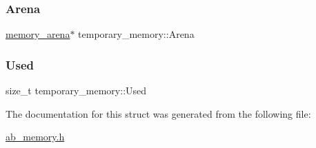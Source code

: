 \subsubsection{\texorpdfstring{Arena}{Arena}}
{\footnotesize\ttfamily \hyperlink{structmemory__arena}{memory\+\_\+arena}$\ast$ temporary\+\_\+memory\+::\+Arena}

\mbox{\label{structtemporary__memory_af2ea8e067d881e044fbecd269e59a556}} 
\subsubsection{\texorpdfstring{Used}{Used}}
{\footnotesize\ttfamily size\+\_\+t temporary\+\_\+memory\+::\+Used}



The documentation for this struct was generated from the following file\+:\begin{DoxyCompactItemize}
\item 
\hyperlink{ab__memory_8h}{ab\+\_\+memory.\+h}\end{DoxyCompactItemize}
